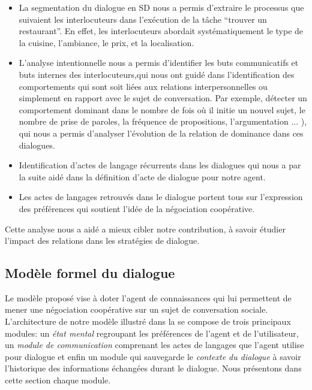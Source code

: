\documentclass [french]{sig-alternate-05-2015}
\begin{document}
\begin{itemize}

		\item  La segmentation du dialogue en SD nous a permis d'extraire le processus que suivaient les interlocuteurs dans l'exécution de la tâche  ``trouver un restaurant''. En effet, les interlocuteurs abordait systématiquement le type de la cuisine, l'ambiance, le prix, et la localisation. 
		
		\item L'analyse intentionnelle nous a permis d'identifier les buts communicatifs et buts internes des interlocuteurs,qui nous ont guidé dans l'identification des comportements qui sont soit liées aux relations interpersonnelles ou simplement en rapport avec le sujet de conversation. Par exemple, détecter un comportement dominant dans le nombre de fois où il initie un nouvel sujet, le nombre de prise de paroles, la fréquence de propositions, l'argumentation ... ), qui nous a permis d'analyser l'évolution de la relation de dominance dans ces dialogues. 
		\item Identification d'actes de langage récurrents dans les dialogues qui nous a par la suite aidé dans la définition d'acte de dialogue pour notre agent.	
		\item Les actes de langages retrouvés dans le dialogue portent tous sur l'expression des préférences qui soutient l'idée de la négociation coopérative.
	
\end{itemize}
\par Cette analyse nous a aidé a mieux cibler notre contribution, à savoir étudier l'impact des relations dans les stratégies de dialogue.

\subsection{Modèle formel du dialogue}
\par  Le modèle proposé vise à doter l'agent de connaissances qui lui permettent de mener une négociation coopérative sur un sujet de conversation sociale. L'architecture de notre modèle illustré dans la  se compose de trois principaux modules: un \textit{état mental} regroupant les préférences de l'agent et de l'utilisateur, un \textit{module de communication} comprenant les actes de langages que l'agent utilise pour dialogue et enfin un module qui sauvegarde le \textit{contexte du dialogue} à savoir l'historique des informations échangées durant le dialogue. Nous présentons dans cette section chaque module.
\end{document}
